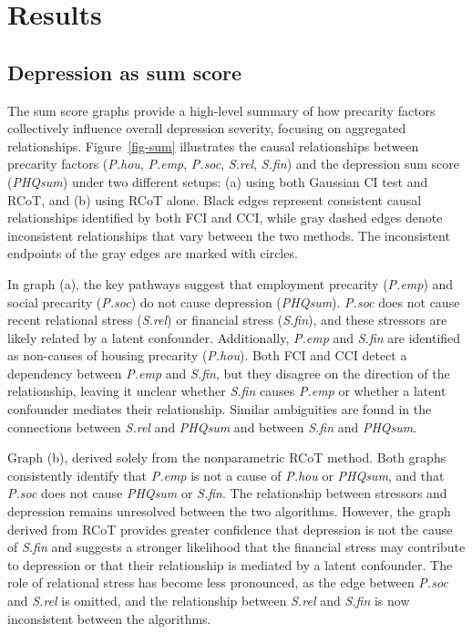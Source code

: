 \documentclass[
]{article}
\begin{document}
\section{Results}\label{results}

\subsection{Depression as sum score}\label{depression-as-sum-score}

The sum score graphs provide a high-level summary of how precarity
factors collectively influence overall depression severity, focusing on
aggregated relationships. Figure~\ref{fig-sum} illustrates the causal
relationships between precarity factors (\emph{P.hou}, \emph{P.emp},
\emph{P.soc}, \emph{S.rel}, \emph{S.fin}) and the depression sum score
(\emph{PHQsum}) under two different setups: (a) using both Gaussian CI
test and RCoT, and (b) using RCoT alone. Black edges represent
consistent causal relationships identified by both FCI and CCI, while
gray dashed edges denote inconsistent relationships that vary between
the two methods. The inconsistent endpoints of the gray edges are marked
with circles.

In graph (a), the key pathways suggest that employment precarity
(\emph{P.emp}) and social precarity (\emph{P.soc}) do not cause
depression (\emph{PHQsum}). \emph{P.soc} does not cause recent
relational stress (\emph{S.rel}) or financial stress (\emph{S.fin}), and
these stressors are likely related by a latent confounder. Additionally,
\emph{P.emp} and \emph{S.fin} are identified as non-causes of housing
precarity (\emph{P.hou}). Both FCI and CCI detect a dependency between
\emph{P.emp} and \emph{S.fin}, but they disagree on the direction of the
relationship, leaving it unclear whether \emph{S.fin} causes
\emph{P.emp} or whether a latent confounder mediates their relationship.
Similar ambiguities are found in the connections between \emph{S.rel}
and \emph{PHQsum} and between \emph{S.fin} and \emph{PHQsum}.

Graph (b), derived solely from the nonparametric RCoT method. Both
graphs consistently identify that \emph{P.emp} is not a cause of
\emph{P.hou} or \emph{PHQsum}, and that \emph{P.soc} does not cause
\emph{PHQsum} or \emph{S.fin}. The relationship between stressors and
depression remains unresolved between the two algorithms. However, the
graph derived from RCoT provides greater confidence that depression is
not the cause of \emph{S.fin} and suggests a stronger likelihood that
the financial stress may contribute to depression or that their
relationship is mediated by a latent confounder. The role of relational
stress has become less pronounced, as the edge between \emph{P.soc} and
\emph{S.rel} is omitted, and the relationship between \emph{S.rel} and
\emph{S.fin} is now inconsistent between the algorithms.
\end{document}

